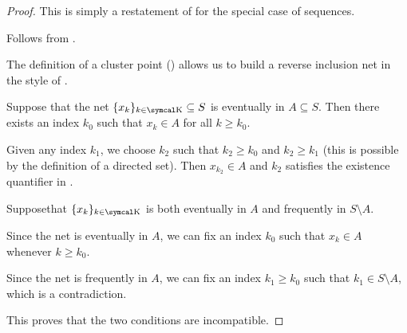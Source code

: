 \begin{proof}
   This is simply a restatement of  for the special case of sequences.

   Follows from .

  The definition of a cluster point () allows us to build a reverse inclusion net in the style of .

   Suppose that the net \( \{ x_k \}_{k \in \CK} \subseteq S \) is eventually in \( A \subseteq S \). Then there exists an index \( k_0 \) such that \( x_k \in A \) for all \( k \geq k_0 \).

  Given any index \( k_1 \), we choose \( k_2 \) such that \( k_2 \geq k_0 \) and \( k_2 \geq k_1 \) (this is possible by the definition of a directed set). Then \( x_{k_2} \in A \) and \( k_2 \) satisfies the existence quantifier in .

   Suppose\LEM that \( \{ x_k \}_{k \in \CK} \) is both eventually in \( A \) and frequently in \( S \setminus A \).

  Since the net is eventually in \( A \), we can fix an index \( k_0 \) such that \( x_k \in A \) whenever \( k \geq k_0 \).

  Since the net is frequently in \( A \), we can fix an index \( k_1 \geq k_0 \) such that \( k_1 \in S \setminus A \), which is a contradiction.

  This proves that the two conditions are incompatible.
\end{proof}

